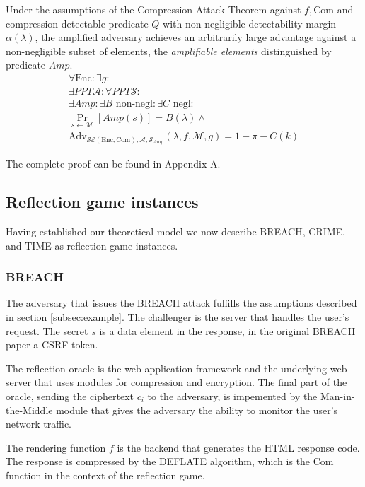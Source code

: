 \begin{lemma}[Amplification]

Under the assumptions of the Compression Attack Theorem against $f, \textrm{Com}$
and compression-detectable predicate $Q$ with non-negligible
detectability margin $\alpha(\lambda)$,
the amplified adversary achieves an arbitrarily large advantage
against a non-negligible subset of elements, the
\textit{amplifiable elements} distinguished by predicate $Amp$.
\begin{align*}
    \forall \textrm{Enc}:
    \exists g:\\
    \exists PPT \mathcal{A}:
    \forall PPT \mathcal{S}:\\
    \exists Amp:
    \exists B \text{ non-negl}:
    \exists C \text{ negl}:\\
    \Pr_{s \leftarrow \mathcal{M}}[Amp(s)] = B(\lambda) \land\\
    \text{Adv}_{\mathcal{SE}(\textrm{Enc}, \textrm{Com}), \mathcal{A}, \mathcal{S}_{Amp}}
    (\lambda, f, \mathcal{M}, g) = 1 - \pi - C(k)
\end{align*}

\end{lemma}

The complete proof can be found in Appendix A.

\subsection{Reflection game instances}
Having established our theoretical model we now describe BREACH, CRIME, and TIME
as reflection game instances.

\subsubsection{BREACH}
The adversary that issues the BREACH attack fulfills the assumptions described
in section \ref{subsec:example}. The challenger is the server that handles the
user's request. The secret $s$ is a data element in the response, in the
original BREACH paper a CSRF token.

The reflection oracle is the web application framework and the underlying web
server that uses modules for compression and encryption. The final part of the
oracle, sending the ciphertext $c_i$ to the adversary, is impemented by the
Man-in-the-Middle module that gives the adversary the ability to monitor the
user's network traffic.

The rendering function $f$ is the backend that generates the HTML response code.
The response is compressed by the DEFLATE algorithm, which is the $\textrm{Com}$
function in the context of the reflection game.

